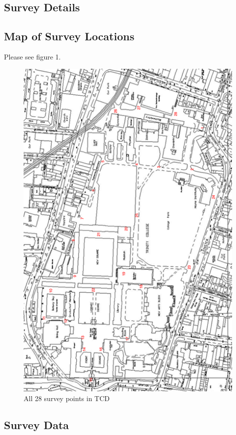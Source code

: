 \documentclass[a4paper,12pt]{article}
\begin{document}
\subsection{Survey Details}

\subsection{Map of Survey Locations}

Please see figure 1.

\begin{figure}[h]

\includegraphics{tcd-survey.png}

\caption{All 28 survey points in TCD}

\end{figure}

\subsection{Survey Data}
\end{document}
